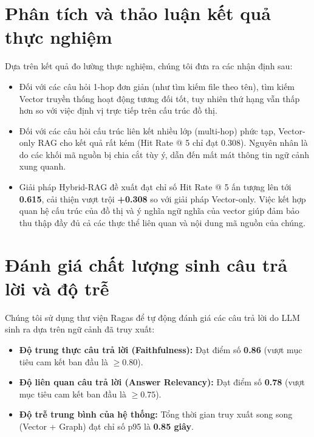 \documentclass[12pt,a4paper,oneside]{report}
\begin{document}
\section{Phân tích và thảo luận kết quả thực nghiệm}
Dựa trên kết quả đo lường thực nghiệm, chúng tôi đưa ra các nhận định sau:
\begin{itemize}
    \item Đối với các câu hỏi 1-hop đơn giản (như tìm kiếm file theo tên), tìm kiếm Vector truyền thống hoạt động tương đối tốt, tuy nhiên thứ hạng vẫn thấp hơn so với việc định vị trực tiếp trên cấu trúc đồ thị.
    \item Đối với các câu hỏi cấu trúc liên kết nhiều lớp (multi-hop) phức tạp, Vector-only RAG cho kết quả rất kém (Hit Rate @ 5 chỉ đạt 0.308). Nguyên nhân là do các khối mã nguồn bị chia cắt tùy ý, dẫn đến mất mát thông tin ngữ cảnh xung quanh.
    \item Giải pháp Hybrid-RAG đề xuất đạt chỉ số Hit Rate @ 5 ấn tượng lên tới \textbf{0.615}, cải thiện vượt trội \textbf{+0.308} so với giải pháp Vector-only. Việc kết hợp quan hệ cấu trúc của đồ thị và ý nghĩa ngữ nghĩa của vector giúp đảm bảo thu thập đầy đủ cả các thực thể liên quan và nội dung mã nguồn của chúng.
\end{itemize}

\section{Đánh giá chất lượng sinh câu trả lời và độ trễ}
Chúng tôi sử dụng thư viện Ragas để tự động đánh giá các câu trả lời do LLM sinh ra dựa trên ngữ cảnh đã truy xuất:
\begin{itemize}
    \item \textbf{Độ trung thực câu trả lời (Faithfulness):} Đạt điểm số \textbf{0.86} (vượt mục tiêu cam kết ban đầu là $\ge 0.80$).
    \item \textbf{Độ liên quan câu trả lời (Answer Relevancy):} Đạt điểm số \textbf{0.78} (vượt mục tiêu cam kết ban đầu là $\ge 0.75$).
    \item \textbf{Độ trễ trung bình của hệ thống:} Tổng thời gian truy xuất song song (Vector + Graph) đạt chỉ số p95 là \textbf{0.85 giây}.
\end{itemize}

\newpage

\end{document}
